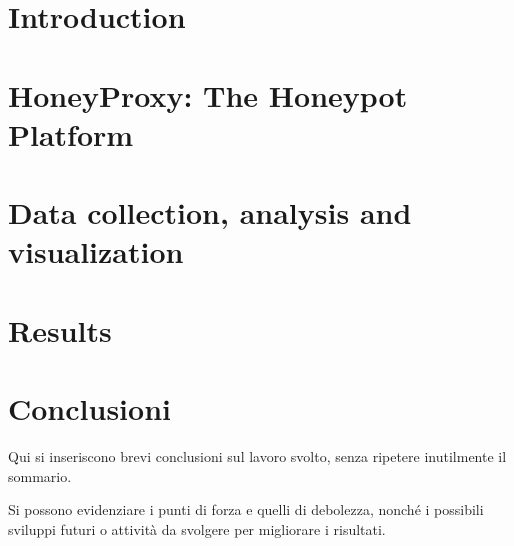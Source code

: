 \documentclass[pdfa%
,cucitura%
]{toptesi}
\begin{document}
\indici

\mainmatter

\chapter{Introduction}



\chapter{HoneyProxy: The Honeypot Platform}



\chapter{Data collection, analysis and visualization}



\chapter{Results}



\chapter{Conclusioni}

Qui si inseriscono brevi conclusioni sul lavoro svolto, senza ripetere inutilmente il sommario.

Si possono evidenziare i punti di forza e quelli di debolezza, nonché i possibili sviluppi futuri o attività da svolgere per migliorare i risultati.



\end{document}
